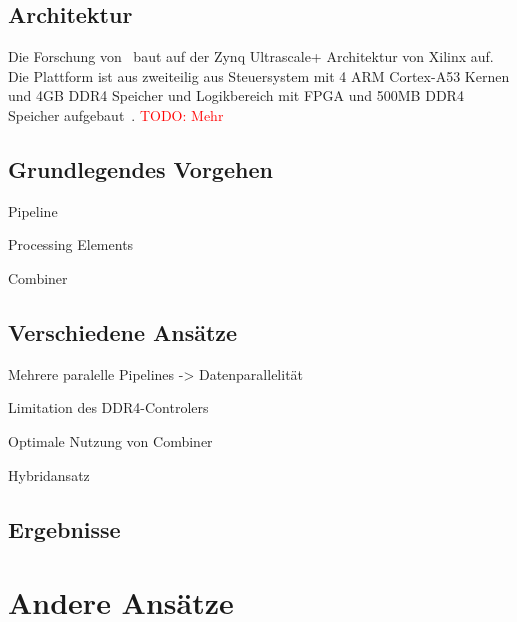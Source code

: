 \documentclass[conference]{IEEEtran}
\newcommand{\todo}[1]{\textcolor{red}{TODO: #1}}
\begin{document}
\subsection{Architektur}
Die Forschung von~\cite{lisa_column_2018} baut auf der Zynq Ultrascale+ Architektur von Xilinx auf. Die Plattform ist aus zweiteilig aus Steuersystem mit
4 ARM Cortex-A53 Kernen und 4GB DDR4 Speicher und Logikbereich mit FPGA und 500MB DDR4 Speicher aufgebaut~\cite{lisa_column_2018}.
\todo{Mehr}

\subsection{Grundlegendes Vorgehen}
Pipeline

Processing Elements

Combiner



\subsection{Verschiedene Ansätze}

Mehrere paralelle Pipelines -> Datenparallelität

Limitation des DDR4-Controlers

Optimale Nutzung von Combiner

Hybridansatz



\subsection{Ergebnisse}

\section{Andere Ansätze}
\end{document}
